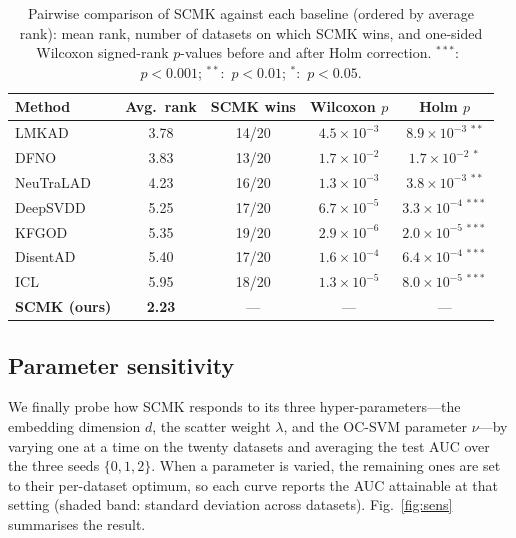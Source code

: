 \documentclass[times, review, 10pt]{elsarticle}
\begin{document}
\begin{table}[t]
\centering
\caption{Pairwise comparison of SCMK against each baseline (ordered by average
rank): mean rank, number of datasets on which SCMK wins, and one-sided Wilcoxon
signed-rank $p$-values before and after Holm correction.
$^{***}$:\ $p<0.001$; $^{**}$:\ $p<0.01$; $^{*}$:\ $p<0.05$.}
\label{tab:wilcoxon}
\small
\setlength{\tabcolsep}{6pt}
\begin{tabular}{lcccc}
\toprule
Method & Avg.\ rank & SCMK wins & Wilcoxon $p$ & Holm $p$\\
\midrule
LMKAD~\cite{lmkad}        & 3.78 & 14/20 & $4.5\times10^{-3}$ & $8.9\times10^{-3\;**}$\\
DFNO~\cite{dfno2024}      & 3.83 & 13/20 & $1.7\times10^{-2}$ & $1.7\times10^{-2\;*}$\\
NeuTraLAD~\cite{neutralad2021} & 4.23 & 16/20 & $1.3\times10^{-3}$ & $3.8\times10^{-3\;**}$\\
DeepSVDD~\cite{deepsvdd2018} & 5.25 & 17/20 & $6.7\times10^{-5}$ & $3.3\times10^{-4\;***}$\\
KFGOD~\cite{kfgod2024}    & 5.35 & 19/20 & $2.9\times10^{-6}$ & $2.0\times10^{-5\;***}$\\
DisentAD~\cite{disentad2025} & 5.40 & 17/20 & $1.6\times10^{-4}$ & $6.4\times10^{-4\;***}$\\
ICL~\cite{icl2022}        & 5.95 & 18/20 & $1.3\times10^{-5}$ & $8.0\times10^{-5\;***}$\\
\midrule
\textbf{SCMK (ours)} & \textbf{2.23} & --- & --- & ---\\
\bottomrule
\end{tabular}
\end{table}

\subsection{Parameter sensitivity}
\label{subsec:exp-sensitivity}

We finally probe how SCMK responds to its three hyper-parameters---the embedding
dimension $d$, the scatter weight $\lambda$, and the OC-SVM parameter $\nu$---by
varying one at a time on the twenty datasets and averaging the test AUC over the
three seeds $\{0,1,2\}$. When a parameter is varied, the remaining ones are set to
their per-dataset optimum, so each curve reports the AUC attainable at that
setting (shaded band: standard deviation across datasets). Fig.~\ref{fig:sens}
summarises the result.
\end{document}
